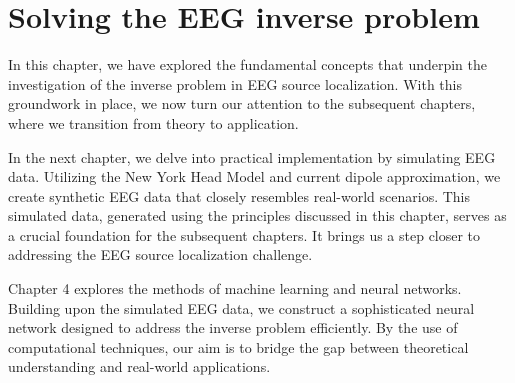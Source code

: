 \documentclass[a4paper, UKenglish, 11pt]{uiomaster}
\begin{document}



\section{Solving the EEG inverse problem}
In this chapter, we have explored the fundamental concepts that underpin the investigation of the inverse problem in EEG source localization. With this groundwork in place, we now turn our attention to the subsequent chapters, where we transition from theory to application.

In the next chapter, we delve into practical implementation by simulating EEG data. Utilizing the New York Head Model and current dipole approximation, we create synthetic EEG data that closely resembles real-world scenarios. This simulated data, generated using the principles discussed in this chapter, serves as a crucial foundation for the subsequent chapters. It brings us a step closer to addressing the EEG source localization challenge.

Chapter 4 explores the methods of machine learning and neural networks. Building upon the simulated EEG data, we construct a sophisticated neural network designed to address the inverse problem efficiently. By the use of computational techniques, our aim is to bridge the gap between theoretical understanding and real-world applications.
\end{document}
